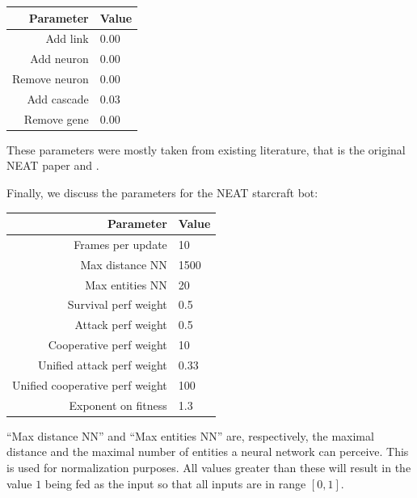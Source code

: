 \begin{tabular}{rl}
    \toprule
    Parameter & Value \\
    \midrule
    Add link & 0.00 \\
    Add neuron & 0.00 \\
    Remove neuron & 0.00 \\
    Add cascade & 0.03 \\
    Remove gene & 0.00 \\
    \bottomrule
\end{tabular}

These parameters were mostly taken from existing literature, that is the
original NEAT paper \cite{StMi02} and \cite{KoAS09}.


Finally, we discuss the parameters for the NEAT starcraft bot:

\begin{tabular}{rl}
    \toprule
    Parameter & Value \\
    \midrule
    Frames per update & 10 \\
    Max distance NN & 1500 \\
    Max entities NN  & 20 \\[1ex]

    Survival perf weight & 0.5 \\
    Attack perf weight  & 0.5 \\
    Cooperative perf weight & 10 \\
    Unified attack perf weight & 0.33 \\
    Unified cooperative perf weight & 100 \\
    Exponent on fitness & 1.3 \\
    \bottomrule
\end{tabular}

``Max distance NN'' and ``Max entities NN'' are, respectively, the
maximal distance and the maximal number of entities a neural network
can perceive.  This is used for normalization purposes. All values
greater than these will result in the value \(1\) being fed as the
input so that all inputs are in range \([0, 1]\).

